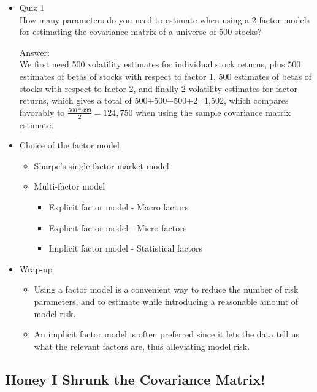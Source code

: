 \documentclass{maths}
\begin{document}
\begin{itemize}
\item Quiz 1\\
How many parameters do you need to estimate when using a 2-factor models for estimating the covariance matrix of a universe of 500 stocks?

Answer:\\
We first need 500 volatility estimates for individual stock returns, plus 500 estimates of betas of stocks with respect to factor 1, 500 estimates of betas of stocks with respect to factor 2, and finally 2 volatility estimates for factor returns, which gives a total of 500+500+500+2=1,502, which compares favorably to $\frac{500*499}{2}=124,750$ when using the sample covariance matrix estimate.\\

\item Choice of the factor model
\begin{itemize}
\item Sharpe's single-factor market model
\item Multi-factor model
\begin{itemize}
\item Explicit factor model - Macro factors
\item Explicit factor model - Micro factors
\item Implicit factor model - Statistical factors\\
\end{itemize}
\end{itemize}

\item Wrap-up
\begin{itemize}
\item Using a factor model is a convenient way to reduce the number of risk parameters, and to estimate while introducing a reasonable amount of model risk.

\item An implicit factor model is often preferred since it lets the data tell us what the relevant factors are, thus alleviating model risk.
\end{itemize}


\end{itemize}


\subsection{Honey I Shrunk the Covariance Matrix!}
\end{document}
